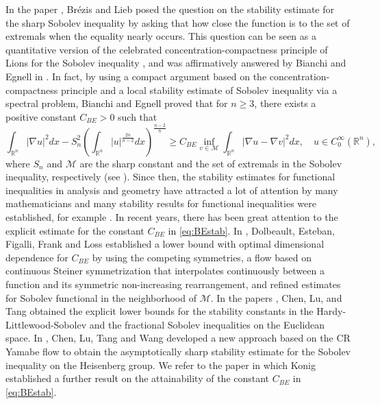 \documentclass[a4paper,12pt]{article}
\theoremstyle{plain}
\theoremstyle{definition}
\theoremstyle{remark}
\def\R{\mathbb R}%
\def\lt{\left}%
\def\rt{\right}%
\numberwithin{equation}{section}
\begin{document}
In the paper \cite{BL1985}, Br\'ezis and Lieb posed the question on the stability estimate for the sharp Sobolev inequality by asking that how close the function is to the set of extremals when the equality nearly occurs. This question can be seen as a quantitative version of the celebrated concentration-compactness principle of Lions for the Sobolev inequality \cite{LionsI}, and was affirmatively answered by Bianchi and Egnell in \cite{BiEg91}. In fact, by using a compact argument based on the concentration-compactness principle and a local stability estimate of Sobolev inequality via a spectral problem, Bianchi and Egnell proved that for $n\geq 3$, there exists a positive constant $C_{BE} >0$ such that
\begin{equation}\label{eq:BEstab}
\int_{\R^n} |\nabla u|^2 dx - S_n^2 \lt(\int_{\R^n} |u|^{\frac{2n}{n-2}} dx\rt)^{\frac{n-2}n} \geq C_{BE} \inf_{v \in \mathcal M} \int_{\R^n} |\nabla u-\nabla v|^2 dx,\quad u\in C_0^\infty(\R^n),
\end{equation}
where $S_n$ and $\mathcal M$ are the sharp constant and the set of extremals in the Sobolev inequality, respectively (see \cite{Aubin,Talenti}). Since then,  the stability estimates for functional inequalities in analysis and geometry have attracted a lot of attention by many mathematicians and many stability results for functional inequalities were established, for example  \cite{NguyenAiM,NguyenGNS,DNCVPDE,BDS26,BDNS25,BDS24,BDS24bis,DT16,DT13,DJ14,BFR24,FZ22,FZ22bis,FN19,Neu,FJ17,FJ15,FMP13,FiCar,FMP10,CLLS,Carlen25,Carlen17,CFL14,CFFP,FMP08,FMP09,CiFe08,Frank24,FrPe24,Frank22,CFW,CFLL24,Seuffert,WeiWu24,WeiWu22,FaInLe,MVNonA,ChenLuTang23,ChenLuTang24,ChenLuTang25,ChenLuTang26,ChenLuTangWang26,InKim}.  In recent years, there has been  great attention to the explicit estimate for the constant $C_{BE}$ in \eqref{eq:BEstab}. In \cite{DEFFL25}, Dolbeault, Esteban, Figalli, Frank and Loss established a lower bound with optimal dimensional dependence for $C_{BE}$ by using the competing symmetries, a flow based on continuous Steiner symmetrization that interpolates continuously between a function and its symmetric non-increasing rearrangement, and refined estimates for Sobolev functional in the neighborhood of $\mathcal M$. In the papers \cite{ChenLuTang24,ChenLuTang25,ChenLuTang26}, Chen, Lu, and Tang obtained the explicit lower bounds for the stability constants in the Hardy-Littlewood-Sobolev and the fractional Sobolev inequalities on the Euclidean space. In \cite{ChenLuTangWang26}, Chen, Lu, Tang and Wang developed a new approach based on the CR Yamabe flow to obtain the asymptotically sharp stability estimate for the Sobolev inequality on the Heisenberg group. We refer to the paper \cite{Konig} in which Konig established a further result on the attainability of the constant $C_{BE}$ in \eqref{eq:BEstab}.
\end{document}

